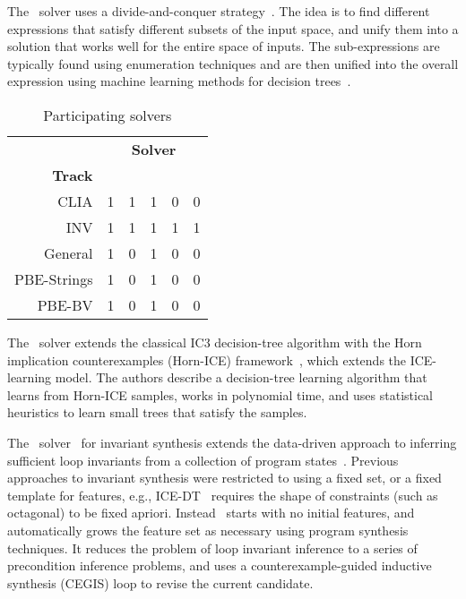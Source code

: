 The \eusolvernew\ solver uses a divide-and-conquer strategy~\cite{AlurCAV15}.
The idea is to find different expressions that satisfy different subsets of the input space,
and unify them into a solution that works well for the entire space of inputs.
The sub-expressions are typically found using enumeration techniques
and are then unified into the overall expression using machine learning methods for decision trees~\cite{AlurRU17}.

\begin{wraptable}{r}{55mm}
	\setlength{\tabcolsep}{5pt}
	\def\arraystretch{1.15}
	\begin{center}
		\begin{tabular}{r||rrrrr}
			& \multicolumn{5}{c}{\textbf{Solver}} \\[8pt]
			\textbf{Track} & \rot{\cvcnew} & \rot{\dryd} & \rot{\eusolvernew} & \rot{\horndini} & \rot{\lig} \\ \hline \hline
			CLIA        & 1 & 1 & 1 & 0 & 0 \\
			INV         & 1 & 1 & 1 & 1 & 1 \\
			General     & 1 & 0 & 1 & 0 & 0 \\ 
			PBE-Strings & 1 & 0 & 1 & 0 & 0 \\ 
			PBE-BV      & 1 & 0 & 1 & 0 & 0 \\
		\end{tabular}
	\end{center}
	\caption{Participating solvers}
	\label{tbl:solvers-in-tracks}
\end{wraptable}

The \horndini\ solver extends the classical IC3 decision-tree algorithm with
the Horn implication counterexamples (Horn-ICE) framework~\cite{EzudheenND0M18},
which extends the ICE-learning model.
The authors describe a decision-tree learning algorithm that learns from Horn-ICE samples,
works in polynomial time, and uses statistical heuristics to learn small trees that satisfy the samples.

The \lig\ solver~\cite{PadhiM17} for invariant synthesis extends the data-driven approach to inferring sufficient loop invariants from a collection of program states~\cite{PadhiSM16}.
Previous approaches to invariant synthesis were restricted to using a fixed set, or a fixed template for features,
e.g., ICE-DT~\cite{GNMR16} requires the shape of constraints (such as octagonal) to be fixed apriori.
Instead \lig\ starts with no initial features, and automatically grows the feature set as necessary using program synthesis techniques.
It reduces the problem of loop invariant inference to a series of precondition inference problems,
and uses a counterexample-guided inductive synthesis (CEGIS) loop to revise the current candidate.